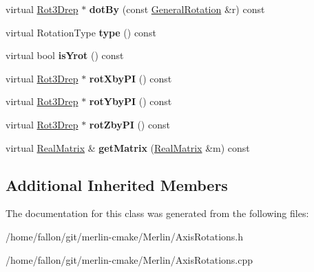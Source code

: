 \begin{DoxyCompactItemize}
virtual \hyperlink{classRot3Drep}{Rot3\+Drep} $\ast$ {\bfseries dot\+By} (const \hyperlink{classGeneralRotation}{General\+Rotation} \&r) const
\item 
\mbox{\label{classRotationY_a5f2d4dcfc76d809edb67865ad785859b}} 
virtual Rotation\+Type {\bfseries type} () const
\item 
\mbox{\label{classRotationY_a442becfecf22eea91304e5e2b284facf}} 
virtual bool {\bfseries is\+Yrot} () const
\item 
\mbox{\label{classRotationY_a48b680e189e71174e506e8428536fff3}} 
virtual \hyperlink{classRot3Drep}{Rot3\+Drep} $\ast$ {\bfseries rot\+Xby\+PI} () const
\item 
\mbox{\label{classRotationY_a815159085039b37311078ebbddc86c9d}} 
virtual \hyperlink{classRot3Drep}{Rot3\+Drep} $\ast$ {\bfseries rot\+Yby\+PI} () const
\item 
\mbox{\label{classRotationY_ae048b7b2a3ca7666078cead8419b0ec0}} 
virtual \hyperlink{classRot3Drep}{Rot3\+Drep} $\ast$ {\bfseries rot\+Zby\+PI} () const
\item 
\mbox{\label{classRotationY_a86dafbeb67d753c22dc90378bf23abef}} 
virtual \hyperlink{classTLAS_1_1Matrix}{Real\+Matrix} \& {\bfseries get\+Matrix} (\hyperlink{classTLAS_1_1Matrix}{Real\+Matrix} \&m) const
\end{DoxyCompactItemize}
\subsection*{Additional Inherited Members}


The documentation for this class was generated from the following files\+:\begin{DoxyCompactItemize}
\item 
/home/fallon/git/merlin-\/cmake/\+Merlin/Axis\+Rotations.\+h\item 
/home/fallon/git/merlin-\/cmake/\+Merlin/Axis\+Rotations.\+cpp\end{DoxyCompactItemize}
